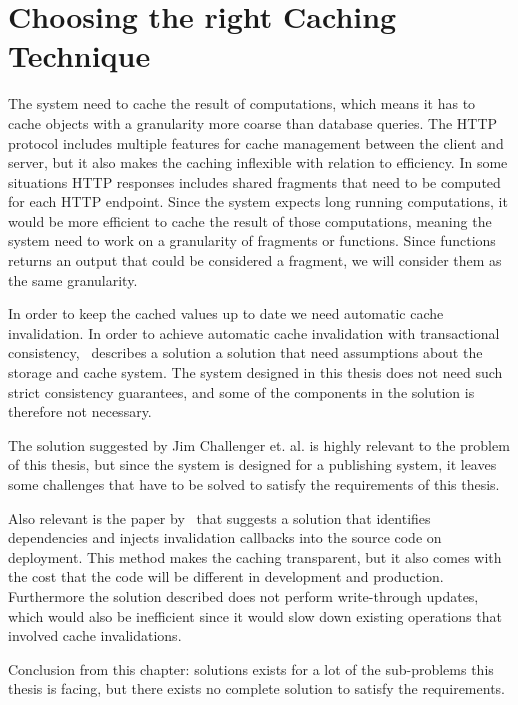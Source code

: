 




\section{Choosing the right Caching Technique}
\label{sec:choosing_the_right_caching_technique}


The system need to cache the result of computations, which means it has to cache objects with a granularity more coarse than database queries. The HTTP protocol includes multiple features for cache management between the client and server, but it also makes the caching inflexible with relation to efficiency. In some situations HTTP responses includes shared fragments that need to be computed for each HTTP endpoint. Since the system expects long running computations, it would be more efficient to cache the result of those computations, meaning the system need to work on a granularity of fragments or functions. Since functions returns an output that could be considered a fragment, we will consider them as the same granularity.

In order to keep the cached values up to date we need automatic cache invalidation. In order to achieve automatic cache invalidation with transactional consistency,~\cite{paper:liskov} describes a solution a solution that need assumptions about the storage and cache system. The system designed in this thesis does not need such strict consistency guarantees, and some of the components in the solution is therefore not necessary.

The solution suggested by Jim Challenger et. al. is highly relevant to the problem of this thesis, but since the system is designed for a publishing system, it leaves some challenges that have to be solved to satisfy the requirements of this thesis.

Also relevant is the paper by~\cite{paper:deploy-time} that suggests a solution that identifies dependencies and injects invalidation callbacks into the source code on deployment. This method makes the caching transparent, but it also comes with the cost that the code will be different in development and production. Furthermore the solution described does not perform write-through updates, which would also be inefficient since it would slow down existing operations that involved cache invalidations.

Conclusion from this chapter: solutions exists for a lot of the sub-problems this thesis is facing, but there exists no complete solution to satisfy the requirements.

